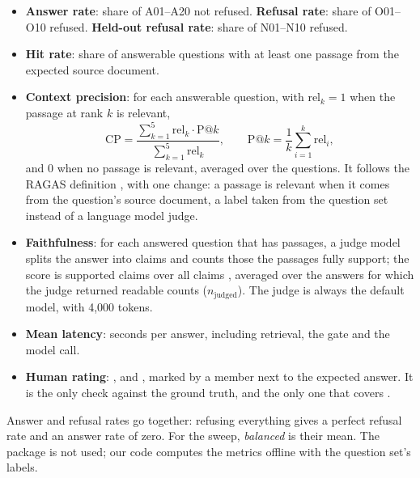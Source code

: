 \begin{itemize}
\item \textbf{Answer rate}: share of A01--A20 not refused. \textbf{Refusal rate}: share of O01--O10 refused. \textbf{Held-out refusal rate}: share of N01--N10 refused.
\item \textbf{Hit rate}: share of answerable questions with at least one passage from the expected source document.
\item \textbf{Context precision}: for each answerable question, with $\mathrm{rel}_k = 1$ when the passage at rank $k$ is relevant,
\begin{equation}
\mathrm{CP} = \frac{\sum_{k=1}^{5} \mathrm{rel}_k \cdot \mathrm{P@}k}{\sum_{k=1}^{5} \mathrm{rel}_k}, \qquad \mathrm{P@}k = \frac{1}{k}\sum_{i=1}^{k}\mathrm{rel}_i,
\end{equation}
and 0 when no passage is relevant, averaged over the questions. It follows the RAGAS definition \citep{ragascontextprecision}, with one change: a passage is relevant when it comes from the question's source document, a label taken from the question set instead of a language model judge.
\item \textbf{Faithfulness}: for each answered question that has passages, a judge model splits the answer into claims and counts those the passages fully support; the score is supported claims over all claims \citep{es2023ragas}, averaged over the answers for which the judge returned readable counts ($n_\text{judged}$). The judge is always the default model, with 4,000 tokens.
\item \textbf{Mean latency}: seconds per answer, including retrieval, the gate and the model call.
\item \textbf{Human rating}: ,  and , marked by a member next to the expected answer. It is the only check against the ground truth, and the only one that covers .
\end{itemize}

Answer and refusal rates go together: refusing everything gives a perfect refusal rate and an answer rate of zero. For the sweep, \emph{balanced} is their mean. The  package is not used; our code computes the metrics offline with the question set's labels.
